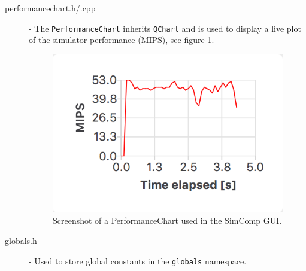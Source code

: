 \begin{description}
\item [performancechart.h/.cpp] - The \texttt{PerformanceChart} inherits \texttt{QChart} and is used to display a live plot of the simulator performance (MIPS), see figure \ref{fig:performancechart}.

\begin{figure}[H]
\centering
\includegraphics[scale=0.6]{img/PerformanceChart.png}
\caption{Screenshot of a PerformanceChart used in the SimComp GUI.}
\label{fig:performancechart}
\end{figure}

\item [globals.h] - Used to store global constants in the \texttt{globals} namespace.

\end{description}

